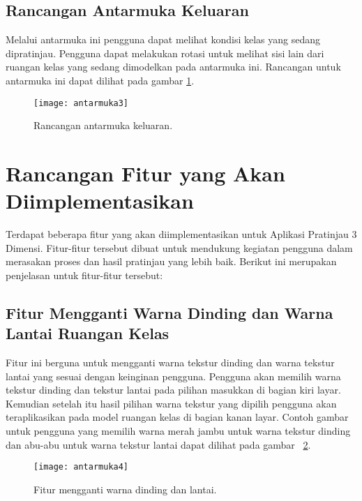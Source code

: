 \subsection{Rancangan Antarmuka Keluaran}
\label{sec:antarmukakeluaran}
Melalui antarmuka ini pengguna dapat melihat kondisi kelas yang sedang dipratinjau. Pengguna dapat melakukan rotasi untuk melihat sisi lain dari ruangan kelas yang sedang dimodelkan pada antarmuka ini. Rancangan untuk antarmuka ini dapat dilihat pada gambar \ref{fig:antarmuka3}.
\begin{figure}[ht]
	\centering
	\texttt{[image: antarmuka3]}
	\caption{Rancangan antarmuka keluaran.}
	\label{fig:antarmuka3}
	\vspace{8mm}
\end{figure}

\section{Rancangan Fitur yang Akan Diimplementasikan}
\label{sec:rancanganfitur}
Terdapat beberapa fitur yang akan diimplementasikan untuk Aplikasi Pratinjau 3 Dimensi. Fitur-fitur tersebut dibuat untuk mendukung kegiatan pengguna dalam merasakan proses dan hasil pratinjau yang lebih baik. Berikut ini merupakan penjelasan untuk fitur-fitur tersebut:

\subsection{Fitur Mengganti Warna Dinding dan Warna Lantai Ruangan Kelas}
\label{sec:fiturgantiwarna}
Fitur ini berguna untuk mengganti warna tekstur dinding dan warna tekstur lantai yang sesuai dengan keinginan pengguna. Pengguna akan memilih warna tekstur dinding dan tekstur lantai pada pilihan masukkan di bagian kiri layar. Kemudian setelah itu hasil pilihan warna tekstur yang dipilih pengguna akan teraplikasikan pada model ruangan kelas di bagian kanan layar. Contoh gambar untuk pengguna yang memilih warna merah jambu untuk warna tekstur dinding dan abu-abu untuk warna tekstur lantai dapat dilihat pada gambar ~\ref{fig:antarmuka4}.
\begin{figure}[ht]
	\centering
	\texttt{[image: antarmuka4]}
	\caption{Fitur mengganti warna dinding dan lantai.}
	\label{fig:antarmuka4}
	\vspace{8mm}
\end{figure}

